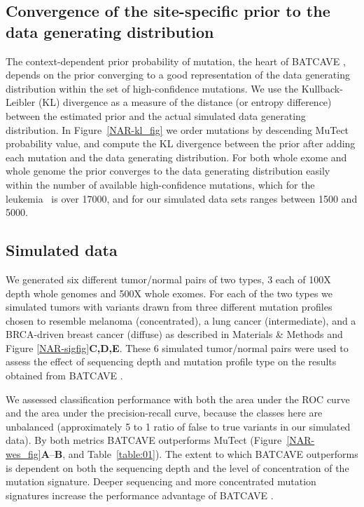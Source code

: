 \documentclass[a4,center,fleqn]{NAR}
\newcommand{\batcave}{BATCAVE }
\begin{document}
\subsection{Convergence of the site-specific prior to the data generating distribution}
The context-dependent prior probability of mutation, the heart of \batcave, depends on the prior converging to a good representation of the data generating distribution within the set of high-confidence mutations.
We use the Kullback-Leibler (KL) divergence as a measure of the distance (or entropy difference) between the estimated prior and the actual simulated data generating distribution.
In Figure~\ref{NAR-kl_fig} we order mutations by descending MuTect probability value, and compute the KL divergence between the prior after adding each mutation and the data generating distribution.
For both whole exome and whole genome the prior converges to the data generating distribution easily within the number of available high-confidence mutations, which for the leukemia~\citep{Griffith2015} is over 17000, and for our simulated data sets ranges between 1500 and 5000.

\subsection{Simulated data}
We generated six different tumor/normal pairs of two types, 3 each of 100X depth whole genomes and 500X whole exomes.
For each of the two types we simulated tumors with variants drawn from three different mutation profiles chosen to resemble melanoma (concentrated), a lung cancer (intermediate), and a BRCA-driven breast cancer (diffuse)  as described in Materials \& Methods and Figure \ref{NAR-sigfig}\textbf{C,D,E}.
These 6 simulated tumor/normal pairs were used to assess the effect of sequencing depth and mutation profile type on the results obtained from \batcave.



We assessed classification performance with both the area under the ROC curve and the area under the precision-recall curve, because the classes here are unbalanced (approximately 5 to 1 ratio of false to true variants in our simulated data).
By both metrics \batcave outperforms MuTect (Figure~\ref{NAR-wes_fig}\textbf{A}--\textbf{B}, and Table~\ref{table:01}).
The extent to which \batcave outperforms is dependent on both the sequencing depth and the level of concentration of the mutation signature.
Deeper sequencing and more concentrated mutation signatures increase the performance advantage of \batcave. 
\end{document}
